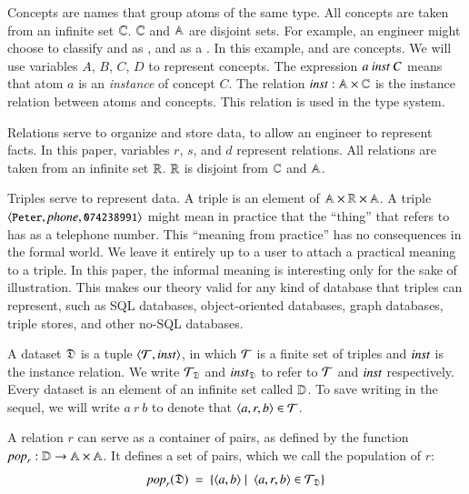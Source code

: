 \documentclass{elsarticle}
\begin{document}
   Concepts are names that group atoms of the same type.
   All concepts are taken from an infinite set $\mathbb{C}$.
   $\mathbb{C}$ and $\mathbb{A}$ are disjoint sets.
   For example, an engineer might choose to classify  and  as ,
   and  as a .
   In this example,  and  are concepts.
   We will use variables $A$, $B$, $C$, $D$ to represent concepts.
   The expression $a\ \inst\ C$ means that atom $a$ is an \emph{instance} of concept $C$.
   The relation $\text{\it inst\/}:\mathbb{A}\times\mathbb{C}$ is the instance relation between atoms and concepts.
   This relation is used in the type system.
   
   Relations serve to organize and store data, to allow an engineer to represent facts.
   In this paper, variables $r$, $s$, and $d$ represent relations.
   All relations are taken from an infinite set $\mathbb{R}$.
   $\mathbb{R}$ is disjoint from $\mathbb{C}$ and $\mathbb{A}$.

   Triples serve to represent data.
   A triple is an element of $\mathbb{A}\times\mathbb{R}\times\mathbb{A}$.
   A triple $\langle{\text{{\tt\small Peter}}},{\text{\it phone\/}},{\text{{\tt\small 074238991}}}\rangle$ might mean in practice that
   the ``thing'' that  refers to has  as a telephone number.
   This ``meaning from practice'' has no consequences in the formal world.
   We leave it entirely up to a user to attach a practical meaning to a triple.
   In this paper, the informal meaning is interesting only for the sake of illustration.
   This makes our theory valid for any kind of database that triples can represent,
   such as SQL databases, object-oriented databases, graph databases, triple stores, and other no-SQL databases.
   
   A dataset $\mathfrak{D}$ is a tuple $\langle{\mathcal{T}},{\text{\it inst\/}}\rangle$,
   in which $\mathcal{T}$ is a finite set of triples
   and $\text{\it inst\/}$ is the instance relation.
   We write $\mathcal{T}_{\mathfrak{D}}$ and $\text{\it inst\/}_{\mathfrak{D}}$ to refer to $\mathcal{T}$ and $\text{\it inst\/}$ respectively.
   Every dataset is an element of an infinite set called $\mathbb{D}$.
   To save writing in the sequel, we will write $a\ r\ b$ to denote that $\langle{a},{r},{b}\rangle\in\mathcal{T}$.

   A relation $r$ can serve as a container of pairs,
   as defined by the function $\text{\it pop\/}_r:\mathbb{D}\rightarrow\mathbb{A}\times\mathbb{A}$.
   It defines a set of pairs, which we call the population of $r$:
\begin{equation}
   \pop{r}{\dataset}\ =\ \{ \pair{a}{b}\mid\ \triple{a}{r}{b}\in\triples_{\dataset}\}
   \label{eqn:pop}
\end{equation}
\end{document}
